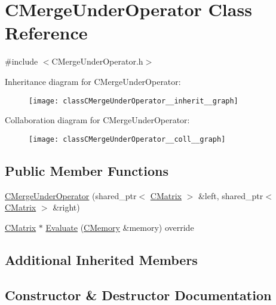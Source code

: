 \hypertarget{classCMergeUnderOperator}{}\section{C\+Merge\+Under\+Operator Class Reference}
\label{classCMergeUnderOperator}


{\ttfamily \#include $<$C\+Merge\+Under\+Operator.\+h$>$}



Inheritance diagram for C\+Merge\+Under\+Operator\+:\nopagebreak
\begin{figure}[H]
\begin{center}
\leavevmode
\texttt{[image: classCMergeUnderOperator\_\_inherit\_\_graph]}
\end{center}
\end{figure}


Collaboration diagram for C\+Merge\+Under\+Operator\+:\nopagebreak
\begin{figure}[H]
\begin{center}
\leavevmode
\texttt{[image: classCMergeUnderOperator\_\_coll\_\_graph]}
\end{center}
\end{figure}
\subsection*{Public Member Functions}
\begin{DoxyCompactItemize}
\item 
\hyperlink{classCMergeUnderOperator_a57d80d1e7e10c9fd30f27f8f01f7bd30}{C\+Merge\+Under\+Operator} (shared\+\_\+ptr$<$ \hyperlink{classCMatrix}{C\+Matrix} $>$ \&left, shared\+\_\+ptr$<$ \hyperlink{classCMatrix}{C\+Matrix} $>$ \&right)
\item 
\hyperlink{classCMatrix}{C\+Matrix} $\ast$ \hyperlink{classCMergeUnderOperator_a4b17a385b3f261bd9a5ab3cb4403e9fb}{Evaluate} (\hyperlink{classCMemory}{C\+Memory} \&memory) override
\end{DoxyCompactItemize}
\subsection*{Additional Inherited Members}


\subsection{Constructor \& Destructor Documentation}

